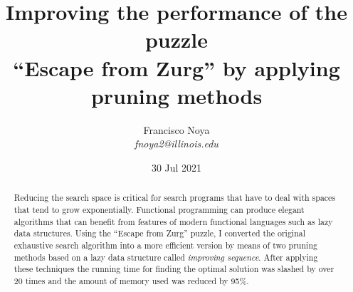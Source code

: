 \documentclass[journal,onecolumn,12pt]{IEEEtran}
\begin{document}

\title{Improving the performance of the puzzle \\``Escape from Zurg'' by applying \\pruning methods}
%

%


\author{
%
 Francisco Noya

 \textit{fnoya2@illinois.edu}
}
\date{30 Jul 2021}
\maketitle
\begin{abstract}\normalsize
 Reducing the search space is critical for search programs that have to deal with
 spaces that tend to grow exponentially. Functional programming can produce elegant
 algorithms that can benefit from features of modern functional languages such as
 lazy data structures. Using the ``Escape from Zurg'' puzzle, I converted the original exhaustive
 search algorithm into a more efficient version by means of two pruning methods based on
 a lazy data structure called \textit{improving sequence}. After applying these techniques the running time for finding the optimal
 solution was slashed by over 20 times and the amount of memory used was
 reduced by 95\%.
\end{abstract}
\end{document}
